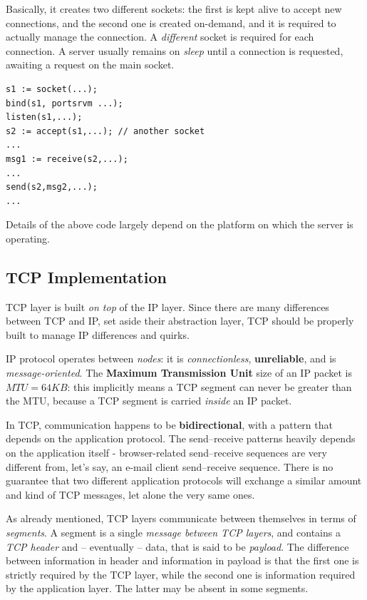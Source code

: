 \documentclass[10pt]{\classname}
\begin{document}
Basically, it creates two different sockets: the first is kept alive to accept
new connections, and the second one is created on-demand, and it is required to
actually manage the connection. A \emph{different} socket is required for each
connection. A server usually remains on \emph{sleep} until a connection is
requested, awaiting a request on the main socket.

\begin{verbatim} 
s1 := socket(...);
bind(s1, portsrvm ...);
listen(s1,...);
s2 := accept(s1,...); // another socket
... 
msg1 := receive(s2,...);
...
send(s2,msg2,...);
... 
\end{verbatim}

Details of the above code largely depend on the platform on which the server is
operating.

\subsection{TCP Implementation}

TCP layer is built \emph{on top} of the IP layer. Since there are many differences
between TCP and IP, set aside their abstraction layer, TCP should be properly
built to manage IP differences and quirks. 

IP protocol operates between \emph{nodes}: it is \emph{connectionless},
\textbf{unreliable}, and is \emph{message-oriented}. The \textbf{Maximum
Transmission Unit} size of an IP packet is $MTU = 64KB$: this implicitly means
a TCP segment can never be greater than the MTU, because a TCP segment is
carried \emph{inside} an IP packet.

In TCP, communication happens to be \textbf{bidirectional}, with a pattern that
depends on the application protocol. The send\---receive patterns heavily depends
on the application itself \-- browser-related send\---receive sequences are
very different from, let's say, an e-mail client send\---receive sequence.
There is no guarantee that two different application protocols will exchange a
similar amount and kind of TCP messages, let alone the very same ones.

As already mentioned, TCP layers communicate between themselves in terms of
\emph{segments}. A segment is a single \emph{message between TCP layers}, and
contains a \emph{TCP header} and \--- eventually \--- data, that is said to be
\emph{payload}. The difference between information in header and information in
payload is that the first one is strictly required by the TCP layer, while the
second one is information required by the application layer. The latter may be
absent in some segments.
\end{document}
